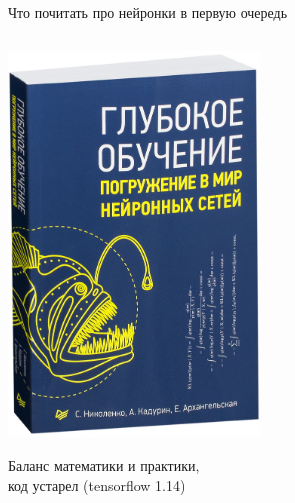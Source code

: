 \documentclass[notes,12pt, aspectratio=169]{beamer}
\newenvironment{wideitemize}{\itemize\addtolength{\itemsep}{10pt}}{\enditemize}
\begin{document}
%	
%	

\begin{frame}{Что почитать про нейронки в первую очередь}
\begin{columns}
	\begin{column}{0.5\textwidth}
\begin{center}
	\includegraphics[width=0.5\textwidth]{book1.jpg}  
	
	\footnotesize Баланс математики и практики, \\ код устарел (tensorflow 1.14)
\end{center}


\end{column}
\end{columns}
\end{frame}
\end{document}
